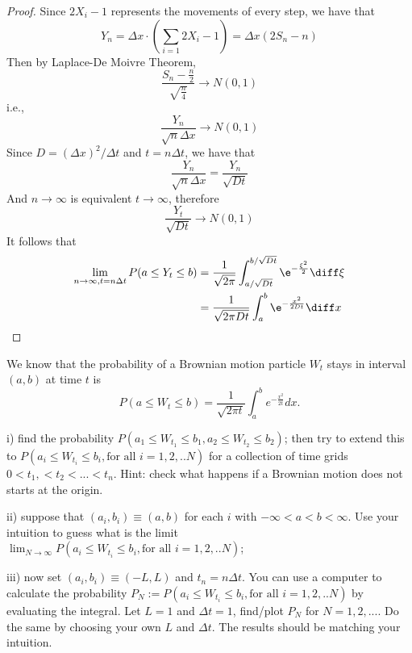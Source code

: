     \begin{proof}
        Since $2X_i-1$ represents the movements of every step,
        we have that
        \[Y_n=\Delta x\cdot\left(\sum_{i=1}2X_i-1\right)
        =\Delta x(2S_n-n)\]
        Then by Laplace-De Moivre Theorem,
        \[\frac{S_n-\frac{n}{2}}{\sqrt{\frac{n}{4}}}\to N(0,1)\]
        i.e.,
        \[\frac{Y_n}{\sqrt{n}\Delta x}\to N(0,1)\]
        Since $D=(\Delta x)^2/\Delta t$ and $t=n\Delta t$,
        we have that
        \[\frac{Y_n}{\sqrt{n}\Delta x}=\frac{Y_n}{\sqrt{Dt}}\]
        And $n\to\infty$ is equivalent $t\to\infty$, therefore
        \[\frac{Y_t}{\sqrt{Dt}}\to N(0,1)\]
        It follows that
        \begin{align*}
        \lim_{n\to\infty,t=n\Delta t}P(a\leq Y_t\leq b)
        &=\frac{1}{\sqrt{2\pi}}
        \int_{a/\sqrt{Dt}}^{b/\sqrt{Dt}}\e^{-\frac{\xi^2}{2}}\diff\xi\\
        &=\frac{1}{\sqrt{2\pi Dt}}
        \int_a^b\e^{-\frac{x^2}{2Dt}}\diff x
        \end{align*}
    \end{proof}

    \problem
    \begin{question}
        We know that the probability of a Brownian motion particle $W_t$
        stays in interval $(a,b)$ at time $t$ is
        \[P(a\leq W_t\leq b)=\frac{1}{\sqrt{2\pi t}}\int_a^be^{-\frac{x^2}{2t}}dx.\]

            \noindent i)
            find the probability $P(a_1\leq W_{t_1}\leq b_1,a_2\leq W_{t_2}\leq b_2)$;
            then try to extend this to  $P(a_i\leq W_{t_i}\leq b_i,\text{for all~} i=1,2,..N)$
            for a collection of time grids $0<t_1,<t_2<...<t_n$. Hint: check what happens 
            if a Brownian motion does not starts at the origin.

            \noindent ii)
            suppose that $(a_i,b_i)\equiv (a,b)$ for each $i$ with $-\infty<a<b<\infty$.
            Use your intuition to guess what is the limit $\lim_{N\rightarrow \infty}
            P(a_i\leq W_{t_i}\leq b_i,\text{for all~} i=1,2,..N)$;

            \noindent iii)
            now set $(a_i,b_i)\equiv (-L,L)$ and $t_n=n\Delta t$.  You can use
            a computer to calculate the probability $P_N:=P(a_i\leq W_{t_i}\leq b_i,
            \text{for all~} i=1,2,..N)$ by evaluating the integral.  Let $L=1$ and 
            $\Delta t=1$, find/plot $P_N$ for $N=1,2,...$.  Do the same by choosing 
            your own $L$ and $\Delta t$.  The results should be matching your intuition.
    \end{question}

